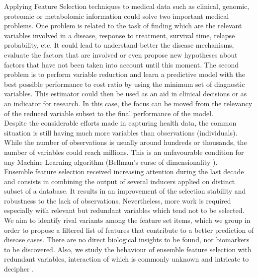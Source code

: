 Applying Feature Selection techniques to medical data such as clinical, genomic, proteomic or metabolomic information could solve two important medical problems. One problem is related to the task of finding which are the relevant variables involved in a disease, response to treatment, survival time, relapse probability, etc. It could lead to understand better the disease mechanisms, evaluate the factors that are involved or even propose new hypotheses about factors that have not been taken into account until this moment. The second problem is to perform variable reduction and learn a predictive model with the best possible performance to cost ratio by using the minimum set of diagnostic variables. This estimator could then be used as an aid in clinical decisions or as an indicator for research. In this case, the focus can be moved from the relevancy of the reduced variable subset to the final performance of the model. 
\\

Despite the considerable efforts made in capturing health data, the common situation is still having much more variables than observations (individuals). While the number of observations is usually around hundreds or thousands, the number of variables could reach millions. This is an unfavourable condition for any Machine Learning algorithm (Bellman's curse of dimensionality \cite{Bellman2015AdaptiveTour}). 
\\

Ensemble feature selection received increasing attention during the last decade \cite{Bolon-Canedo2019EnsemblesTrends} \cite{Pes2020EnsembleDomains} \cite{Abeel2009RobustMethods} \cite{BenBrahim2017EnsembleStudy} and consists in combining the output of several inducers applied on distinct subset of a database. It results in an improvement of the selection stability and robustness to the lack of observations. Nevertheless, more work is required especially with relevant but redundant variables which tend not to be selected. 
\\

We aim to identify rival variants among the feature set items, which we group in order to propose a filtered list of features that contribute to a better prediction of disease cases. There are no direct biological insights to be found, nor biomarkers to be discovered. Also, we study the behaviour of ensemble feature selection with redundant variables, interaction of which is commonly unknown and intricate to decipher \cite{Saeys2007ABioinformatics}.
\\

